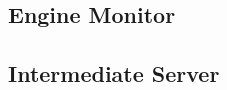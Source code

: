 \documentclass{jsbook}
\begin{document}
\subsubsection{}
\subsubsection{}
\subsubsection{}
\subsubsection{}

\subsection{Engine Monitor}

\subsubsection{}
\subsubsection{}
\subsubsection{}
\subsubsection{}

\subsection{Intermediate Server}

\subsubsection{}
\subsubsection{}
\subsubsection{}
\subsubsection{}
\end{document}
